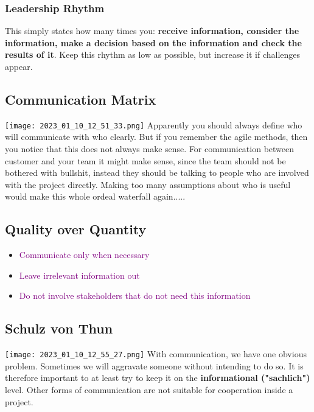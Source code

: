 \documentclass[main.tex,fontsize=12pt,paper=a4,paper=landscape,DIV=calc,]{scrartcl}
\begin{document}
\begin{multicols*}{2}
\subsubsection{Leadership Rhythm} 
This simply states how many times you: \textbf{receive information, consider the information, make a decision based on the information and check the results of it}.\newline
Keep this rhythm as low as possible, but increase it if challenges appear.

\subsection{Communication Matrix}
\texttt{[image: 2023\_01\_10\_12\_51\_33.png]}\newline
Apparently you should always define who will communicate with who clearly.\newline
But if you remember the agile methods, then you notice that this does not always make sense.\newline
For communication between customer and your team it might make sense, since the team should not be bothered with bullshit, instead they should be talking to people who are involved with the project directly.\newline
Making too many assumptions about who is useful would make this whole ordeal waterfall again.....
 
\subsection{Quality over Quantity}
\begin{itemize}
\item \textcolor{purple}{Communicate only when necessary}
\item \textcolor{purple}{Leave irrelevant information out}
\item \textcolor{purple}{Do not involve stakeholders that do not need this information}
\end{itemize}

\subsection{Schulz von Thun}
\texttt{[image: 2023\_01\_10\_12\_55\_27.png]}\newline
With communication, we have one obvious problem. Sometimes we will aggravate someone without intending to do so.\newline
It is therefore important to at least try to keep it on the \textbf{informational ("sachlich")} level.\newline
Other forms of communication are not suitable for cooperation inside a project. 


\end{multicols*}
\end{document}
